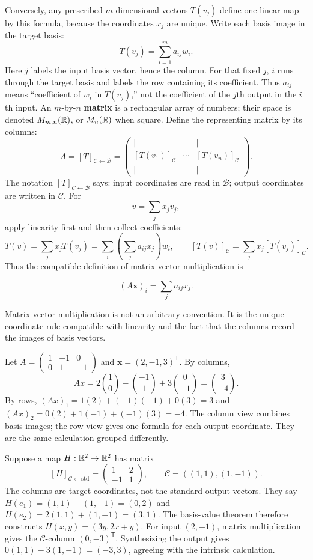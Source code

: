 Conversely, any prescribed $m$-dimensional vectors $T(v_j)$ define one
linear map by this formula, because the coordinates $x_j$ are unique.
Write each basis image in the target basis:
\[
T(v_j)=\sum_{i=1}^m a_{ij}w_i.
\]
Here $j$ labels the input basis vector, hence the column. For that fixed
$j$, $i$ runs through the target basis and labels the row containing its
coefficient. Thus $a_{ij}$ means ``coefficient of $w_i$ in $T(v_j)$,''
not the coefficient of the $j$th output in the $i$th input.
An $m$-by-$n$ \textbf{matrix} is a rectangular array of numbers; their
space is denoted $M_{m,n}(\mathbb{R})$, or $M_n(\mathbb{R})$ when square.
Define the representing matrix by its columns:
\[
A=[T]_{\mathcal C\leftarrow\mathcal B}
=\begin{pmatrix}|&&|\\{}[T(v_1)]_{\mathcal C}&\cdots&[T(v_n)]_{\mathcal C}\\|&&|\end{pmatrix}.
\]
The notation $[T]_{\mathcal C\leftarrow\mathcal B}$ says:
input coordinates are read in $\mathcal B$; output coordinates are written
in $\mathcal C$. For
\[
v=\sum_j x_jv_j,
\]
 apply linearity first and then collect coefficients:
\[
T(v)=\sum_j x_jT(v_j)=\sum_i\left(\sum_j a_{ij}x_j\right)w_i,
\qquad [T(v)]_{\mathcal C}=\sum_j x_j[T(v_j)]_{\mathcal C}.
\]
Thus the compatible definition of matrix-vector multiplication is

\[
(A\mathbf{x})_i=\sum_j a_{ij}x_j.
\]

Matrix-vector multiplication is not an arbitrary convention. It is the
unique coordinate rule compatible with linearity and the fact that the
columns record the images of basis vectors.

\begin{example}
Let $A=\left(\begin{matrix}1&-1&0\\0&1&-1\end{matrix}\right)$ and
$\mathbf{x}=(2,-1,3)^{\mathsf T}$. By columns,
\[
Ax=2\binom10-\binom{-1}1+3\binom0{-1}=\binom3{-4}.
\]
By rows, $(Ax)_1=1(2)+(-1)(-1)+0(3)=3$ and
$(Ax)_2=0(2)+1(-1)+(-1)(3)=-4$.
The column view combines basis images; the row view gives one formula for
each output coordinate. They are the same calculation grouped differently.
\end{example}
\begin{example}
Suppose a map $H:\mathbb{R}^2\to\mathbb{R}^2$ has matrix
\[
[H]_{\mathcal C\leftarrow\mathrm{std}}
=\begin{pmatrix}1&2\\-1&1\end{pmatrix},\qquad
\mathcal C=((1,1),(1,-1)).
\]
The columns are target coordinates, not the standard output vectors.
They say $H(e_1)=(1,1)-(1,-1)=(0,2)$ and
$H(e_2)=2(1,1)+(1,-1)=(3,1)$. The basis-value theorem therefore constructs
$H(x,y)=(3y,2x+y)$. For input $(2,-1)$, matrix multiplication gives
the $\mathcal C$-column $(0,-3)^{\mathsf T}$. Synthesizing the output gives
$0(1,1)-3(1,-1)=(-3,3)$, agreeing with the intrinsic calculation.
\end{example}

